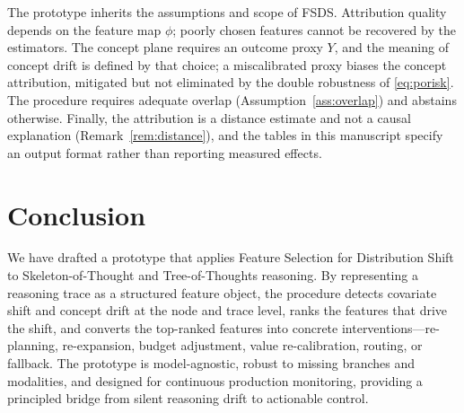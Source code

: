 \documentclass[11pt]{article}
\begin{document}
The prototype inherits the assumptions and scope of FSDS. Attribution quality
depends on the feature map $\phi$; poorly chosen features cannot be recovered by
the estimators. The concept plane requires an outcome proxy $Y$, and the meaning
of concept drift is defined by that choice; a miscalibrated proxy biases the
concept attribution, mitigated but not eliminated by the double robustness of
\eqref{eq:porisk}. The procedure requires adequate overlap
(Assumption~\ref{ass:overlap}) and abstains otherwise. Finally, the attribution
is a distance estimate and not a causal explanation (Remark~\ref{rem:distance}),
and the tables in this manuscript specify an output format rather than reporting
measured effects.

\section{Conclusion}
\label{sec:conclusion}

We have drafted a prototype that applies Feature Selection for Distribution Shift
to Skeleton-of-Thought and Tree-of-Thoughts reasoning. By representing a
reasoning trace as a structured feature object, the procedure detects covariate
shift and concept drift at the node and trace level, ranks the features that
drive the shift, and converts the top-ranked features into concrete
interventions---re-planning, re-expansion, budget adjustment, value
re-calibration, routing, or fallback. The prototype is model-agnostic, robust to
missing branches and modalities, and designed for continuous production
monitoring, providing a principled bridge from silent reasoning drift to
actionable control.

\appendix

\end{document}
